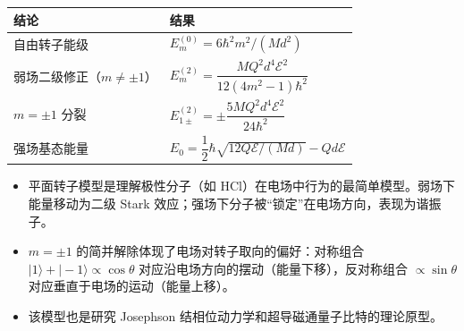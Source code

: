\begin{formulabox}[答案汇总]
\begin{center}
\begin{tabular}{ll}
\toprule
\textbf{结论} & \textbf{结果} \\
\midrule
自由转子能级 & $E_m^{(0)}=6\hbar^2m^2/(Md^2)$ \\
弱场二级修正（$m\neq\pm1$） & $E_m^{(2)}=\dfrac{MQ^2d^4\mathcal{E}^2}{12(4m^2-1)\hbar^2}$ \\
$m=\pm1$ 分裂 & $E_{1\pm}^{(2)}=\pm\dfrac{5MQ^2d^4\mathcal{E}^2}{24\hbar^2}$ \\
强场基态能量 & $E_0=\dfrac12\hbar\sqrt{12Q\mathcal{E}/(Md)}-Qd\mathcal{E}$ \\
\bottomrule
\end{tabular}
\end{center}
\end{formulabox}

\begin{insightbox}[物理图像]
\begin{itemize}
    \item 平面转子模型是理解极性分子（如 HCl）在电场中行为的最简单模型。弱场下能量移动为二级 Stark 效应；强场下分子被``锁定''在电场方向，表现为谐振子。
    \item $m=\pm1$ 的简并解除体现了电场对转子取向的偏好：对称组合 $|1\rangle+|-1\rangle\propto\cos\theta$ 对应沿电场方向的摆动（能量下移），反对称组合 $\propto\sin\theta$ 对应垂直于电场的运动（能量上移）。
    \item 该模型也是研究 Josephson 结相位动力学和超导磁通量子比特的理论原型。
\end{itemize}
\end{insightbox}
